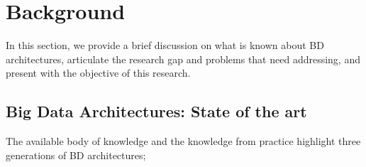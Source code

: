 \documentclass[review]{elsarticle}
\begin{document}
\section{Background} \label{background-section}

In this section, we provide a brief discussion on what is known about BD architectures, articulate the research gap and problems that need addressing, and present with the objective of this research. 

\subsection{Big Data Architectures: State of the art} \label{State of the art}

The available body of knowledge and the knowledge from practice highlight three generations of BD architectures;
\end{document}
